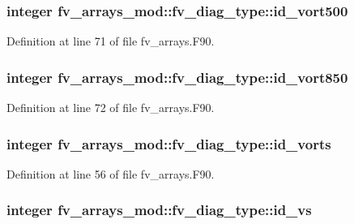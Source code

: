 \subsubsection[{id\-\_\-vort500}]{\setlength{\rightskip}{0pt plus 5cm}integer fv\-\_\-arrays\-\_\-mod\-::fv\-\_\-diag\-\_\-type\-::id\-\_\-vort500}\label{structfv__arrays__mod_1_1fv__diag__type_a20986870f6ebf7327bd41204a847ea6d}


Definition at line 71 of file fv\-\_\-arrays.\-F90.

\subsubsection[{id\-\_\-vort850}]{\setlength{\rightskip}{0pt plus 5cm}integer fv\-\_\-arrays\-\_\-mod\-::fv\-\_\-diag\-\_\-type\-::id\-\_\-vort850}\label{structfv__arrays__mod_1_1fv__diag__type_a90c8fa07b05631b8ceea17d647559739}


Definition at line 72 of file fv\-\_\-arrays.\-F90.

\subsubsection[{id\-\_\-vorts}]{\setlength{\rightskip}{0pt plus 5cm}integer fv\-\_\-arrays\-\_\-mod\-::fv\-\_\-diag\-\_\-type\-::id\-\_\-vorts}\label{structfv__arrays__mod_1_1fv__diag__type_a46e934bee6d16771bbc16e1cf8c1e446}


Definition at line 56 of file fv\-\_\-arrays.\-F90.

\subsubsection[{id\-\_\-vs}]{\setlength{\rightskip}{0pt plus 5cm}integer fv\-\_\-arrays\-\_\-mod\-::fv\-\_\-diag\-\_\-type\-::id\-\_\-vs}\label{structfv__arrays__mod_1_1fv__diag__type_aab874106757cebdaceffb5fbe107b531}


